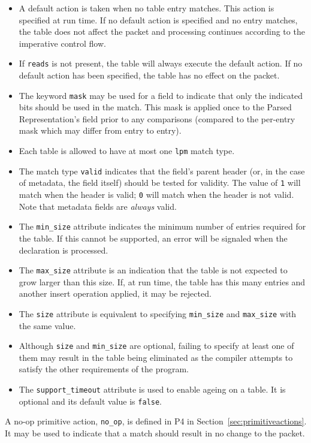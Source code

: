 \documentclass[12pt]{article}
\begin{document}
\begin{itemize}
\item
A default action is taken when no table entry matches.  This action is specified
at run time. If no default action is specified and no entry matches, the table
does not affect the packet and processing continues according to the imperative
control flow.
\item
If \texttt{reads} is not present, the table will always execute the default action.
If no default action has been specified, the table has no effect on the packet.
\item
The keyword \texttt{mask} may be used for a field to indicate that only the indicated
bits should be used in the match. This mask is applied once to the Parsed
Representation's field prior to any comparisons (compared to the per-entry
mask which may differ from entry to entry).
\item
Each table is allowed to have at most one \texttt{lpm} match type.
\item
The match type \texttt{valid} indicates that the field's parent header (or, in the
case of metadata, the field itself) should be tested for validity.  The value
of \texttt{1} will match when the header is valid; \texttt{0} will match when the header is
not valid. Note that metadata fields
are \textit{always} valid.
\item
The \texttt{min_size} attribute indicates the minimum number of entries required
for the table. If this cannot be supported, an error will be signaled when
the declaration is processed.
\item
The \texttt{max_size} attribute is an indication that the table is not expected to
grow larger than this size. If, at run time, the table has this many entries
and another insert operation applied, it may be rejected.
\item
The \texttt{size} attribute is equivalent to specifying \texttt{min_size} and \texttt{max_size} with
the same value.
\item
Although \texttt{size} and \texttt{min_size} are optional, failing to specify at least one
of them may result in the table being eliminated as the compiler attempts
to satisfy the other requirements of the program.
\item
The \texttt{support_timeout} attribute is used to enable ageing on a table. It
is optional and its default value is \texttt{false}.
\end{itemize}


A no-op primitive action, \texttt{no_op}, is defined in P4 in
Section~\ref{sec:primitiveactions}. It may be used to indicate that
a match should result in no change to the packet.
\end{document}
